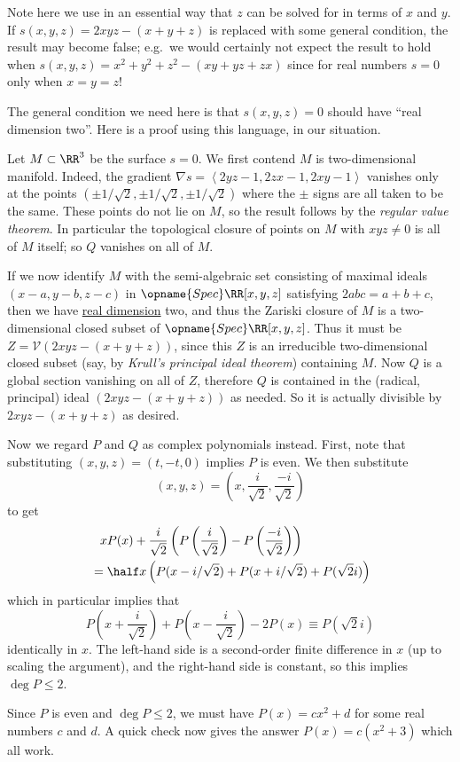 \documentclass[11pt]{scrartcl}
\begin{document}
\begin{remark*}
  Note here we use in an essential way that $z$
  can be solved for in terms of $x$ and $y$.
  If $s(x,y,z) = 2xyz-(x+y+z)$ is replaced with some general condition,
  the result may become false; e.g.\ we would
  certainly not expect the result to hold when
  $s(x,y,z) = x^2+y^2+z^2-(xy+yz+zx)$
  since for real numbers $s = 0$ only when $x=y=z$!

  The general condition we need here is that $s(x,y,z) = 0$
  should have ``real dimension two''.
  Here is a proof using this language, in our situation.

  Let $M \subset \RR^3$ be the surface $s=0$.
  We first contend $M$ is two-dimensional manifold.
  Indeed, the gradient $\nabla s = \left< 2yz-1, 2zx-1, 2xy-1 \right>$
  vanishes only at the points $(\pm 1/\sqrt2, \pm 1/\sqrt2, \pm 1/\sqrt2)$
  where the $\pm$ signs are all taken to be the same.
  These points do not lie on $M$,
  so the result follows by the \emph{regular value theorem}.
  In particular the topological closure of points on $M$
  with $xyz \neq 0$ is all of $M$ itself;
  so $Q$ vanishes on all of $M$.

  If we now identify $M$ with the semi-algebraic set consisting of
  maximal ideals $(x-a,y-b,z-c)$ in $\opname{Spec} \RR[x,y,z]$
  satisfying $2abc = a+b+c$, then we have
  \href{https://en.wikipedia.org/wiki/Dimension_of_an_algebraic_variety#Real_dimension}{real dimension} two,
  and thus the Zariski closure of $M$
  is a two-dimensional closed subset of $\opname{Spec} \RR[x,y,z]$.
  Thus it must be $Z = \mathcal V(2xyz-(x+y+z))$,
  since this $Z$ is an irreducible two-dimensional closed subset
  (say, by \emph{Krull's principal ideal theorem}) containing $M$.
  Now $Q$ is a global section vanishing on all of $Z$,
  therefore $Q$ is contained in the
  (radical, principal) ideal $(2xyz-(x+y+z))$ as needed.
  So it is actually divisible by $2xyz-(x+y+z)$ as desired.
\end{remark*}

Now we regard $P$ and $Q$ as complex polynomials instead.
First, note that substituting $(x,y,z) = (t,-t,0)$ implies $P$ is even.
We then substitute
\[ (x,y,z) = \left(x, \frac{i}{\sqrt2}, \frac{-i}{\sqrt2}\right) \]
to get
\begin{align*}
  &\phantom= xP(x) + \frac{i}{\sqrt2}
  \left( P\left( \frac{i}{\sqrt2} \right)
    - P\left( \frac{-i}{\sqrt2} \right) \right) \\
  &= \half x\left( P(x-i/\sqrt2) + P(x+i/\sqrt2) + P(\sqrt2i) \right)
\end{align*}
which in particular implies that
\[ P\left( x + \frac{i}{\sqrt2} \right)
  + P\left( x - \frac{i}{\sqrt2} \right)
  - 2P(x) \equiv P(\sqrt 2i) \]
identically in $x$.
The left-hand side is a second-order finite difference in $x$
(up to scaling the argument),
and the right-hand side is constant, so this implies $\deg P \le 2$.

Since $P$ is even and $\deg P \le 2$,
we must have $P(x) = cx^2 + d$ for some real numbers $c$ and $d$.
A quick check now gives the answer $P(x) = c(x^2+3)$
which all work.
\pagebreak
\end{document}
